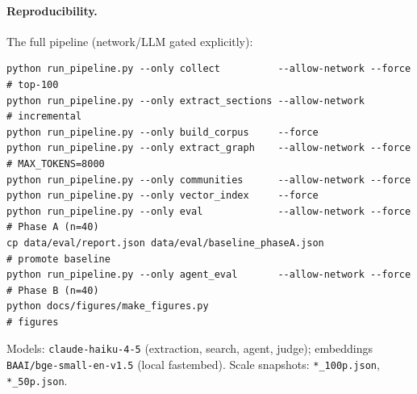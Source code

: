 \documentclass[11pt]{article}
\begin{document}
\paragraph{Reproducibility.} The full pipeline (network/LLM gated explicitly):
\begin{verbatim}
python run_pipeline.py --only collect          --allow-network --force  # top-100
python run_pipeline.py --only extract_sections --allow-network          # incremental
python run_pipeline.py --only build_corpus     --force
python run_pipeline.py --only extract_graph    --allow-network --force  # MAX_TOKENS=8000
python run_pipeline.py --only communities      --allow-network --force
python run_pipeline.py --only vector_index     --force
python run_pipeline.py --only eval             --allow-network --force  # Phase A (n=40)
cp data/eval/report.json data/eval/baseline_phaseA.json                 # promote baseline
python run_pipeline.py --only agent_eval       --allow-network --force  # Phase B (n=40)
python docs/figures/make_figures.py                                     # figures
\end{verbatim}
Models: \texttt{claude-haiku-4-5} (extraction, search, agent, judge); embeddings \texttt{BAAI/bge-small-en-v1.5} (local fastembed). Scale snapshots: \texttt{*\_100p.json}, \texttt{*\_50p.json}.



\end{document}
